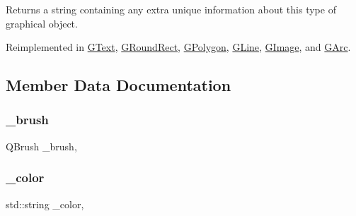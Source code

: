 Returns a string containing any extra unique information about this type of graphical object. 



Reimplemented in \mbox{\hyperlink{classsgl_1_1GText_a04364e674911906702b748deec32db18}{G\+Text}}, \mbox{\hyperlink{classsgl_1_1GRoundRect_a04364e674911906702b748deec32db18}{G\+Round\+Rect}}, \mbox{\hyperlink{classsgl_1_1GPolygon_a04364e674911906702b748deec32db18}{G\+Polygon}}, \mbox{\hyperlink{classsgl_1_1GLine_a04364e674911906702b748deec32db18}{G\+Line}}, \mbox{\hyperlink{classsgl_1_1GImage_a04364e674911906702b748deec32db18}{G\+Image}}, and \mbox{\hyperlink{classsgl_1_1GArc_a04364e674911906702b748deec32db18}{G\+Arc}}.



\subsection{Member Data Documentation}
\mbox{\label{classsgl_1_1GObject_aab24462ec896b596d99911767b0912d0}} 
\subsubsection{\texorpdfstring{\+\_\+brush}{\_brush}}
{\footnotesize\ttfamily Q\+Brush \+\_\+brush\hspace{0.3cm}{\ttfamily [protected]}, {\ttfamily [inherited]}}

\mbox{\label{classsgl_1_1GObject_a1134e770ae4315ea8bc1201e2f21da8b}} 
\subsubsection{\texorpdfstring{\+\_\+color}{\_color}}
{\footnotesize\ttfamily std\+::string \+\_\+color\hspace{0.3cm}{\ttfamily [protected]}, {\ttfamily [inherited]}}

\mbox{\label{classsgl_1_1GObject_a003fdd343d9b7505c53a8b7a134200ed}} 

